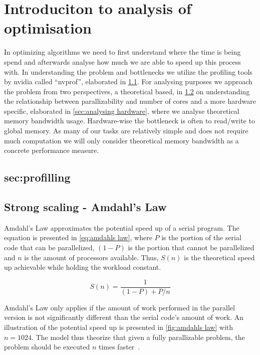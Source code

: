 \section{Introduciton to analysis of optimisation}
\label{sec:introduction to analysis of optimisation}
In optimizing algorithms we need to first understand where the time is being spend and afterwards analyse how much we are able to speed up this process with.
In understanding the problem and bottlenecks we utilize the profiling tools by nvidia called ``nvprof'', elaborated in \cref{sec:profiling}.
For analysing purposes we approach the problem from two perspectives, a theoretical based, in \cref{sec:amdahls law} on understanding the relationship between parallizability and number of cores and a more hardware specific, elaborated in \cref{sec:analysing hardware}, where we analyse theoretical memory bandwidth usage.
Hardware-wise the bottleneck is often to read/write to global memory.
As many of our tasks are relatively simple and does not require much computation we will only consider theoretical memory bandwidth as a concrete performance measure.

\subsection{sec:profilling}
\label{sec:profiling}


\subsection{Strong scaling - Amdahl's Law}
\label{sec:amdahls law}

Amdahl's Law approximates the potential speed up of a serial program.
The equation is presented in \cref{eq:amdahls law}, where $P$ is the portion of the serial code that can be parallelized, $(1-P)$ is the portion that cannot be parallelized and $n$ is the amount of processors available.
Thus, $S(n)$ is the theoretical speed up achievable while holding the workload constant.

\begin{equation}
  \label{eq:amdahls law}
  S(n) = \frac{1}{(1-P) + P/n}
\end{equation}

Amdahl's Law only applies if the amount of work performed in the parallel version is not significantly different than the serial code's amount of work.
An illustration of the potential speed up is presented in \cref{fig:amdahls law} with $n=1024$.
The model thus theorize that given a fully parallizable problem, the problem should be executed $n$ times faster~\cite{farber2011cuda}.

